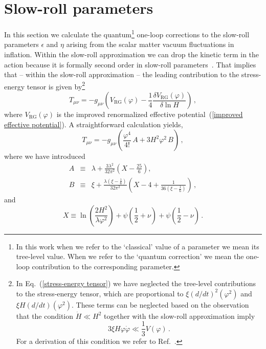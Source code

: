 \section{Slow-roll parameters}
\label{Slow-roll parameters}

 In this section we calculate the quantum\footnote{In this work when we
refer to the `classical' value of a parameter we mean
its tree-level value. When we refer to the `quantum correction' we
mean the one-loop contribution to the corresponding parameter.}
one-loop corrections to the slow-roll parameters $\epsilon $ and $\eta$
arising from the scalar matter vacuum fluctuations in inflation.
 Within the slow-roll approximation we can drop the kinetic term in
the action because it is formally second order in slow-roll
parameters~\cite{Liddle:2000cg}. That implies that -- within the
slow-roll approximation -- the leading contribution to the
stress-energy tensor is given by\footnote{In
Eq.~(\ref{stress-energy tensor}) we have neglected the tree-level
contributions to the stress-energy tensor, which are proportional
to $\xi(d/dt)^2(\varphi^2)$ and $\xi H(d/dt)(\varphi^2)$.
 These terms can be neglected based on the observation that the condition
$\dot{H}\ll H^2$ together with the slow-roll approximation imply
\begin{equation}
3\xi H\varphi\dot{\varphi}\ll \frac13 V(\varphi)\,.
\end{equation}
For a derivation of this condition we refer to
Ref.~\cite{Ante:thesis}.}
\begin{equation}
T_{\mu\nu} = -
g_{\mu\nu}\left(V_{\mathrm{RG}}(\varphi)-\frac14\frac{\delta
V_{\mathrm{RG}}(\varphi)}{\delta\ln H}\right)
\,,
\label{stress-energy tensor}
\end{equation}
where $V_{\mathrm{RG}}(\varphi)$ is the improved renormalized
effective potential~(\ref{improved effective potential}).
A straightforward calculation yields,
\begin{equation}
T_{\mu\nu} = - g_{\mu\nu}\left(\frac{\varphi^4}{4!}\, A
+3H^2\varphi^2\, B\right)\,,
\label{stress-energy tensor2}
\end{equation}
where we have introduced
\begin{eqnarray}
A & \equiv & \lambda
  + \frac{3\lambda^2}{32\pi^2}\left(X-\frac{25}{6}\right),\nonumber\\
B & \equiv & \xi
+\frac{\lambda(\xi-\frac16)}{32\pi^2}\left(X-4+\frac{1}{36(\xi-\frac16)}\right)
\,,
\label{AB}
\end{eqnarray}
and
\begin{equation}
X\equiv \ln\left(\frac{2H^2}{\lambda\varphi^2}\right) +
\psi\left(\frac12+\nu\right) + \psi\left(\frac12-\nu\right)
\,.
\label{X}
\end{equation}
